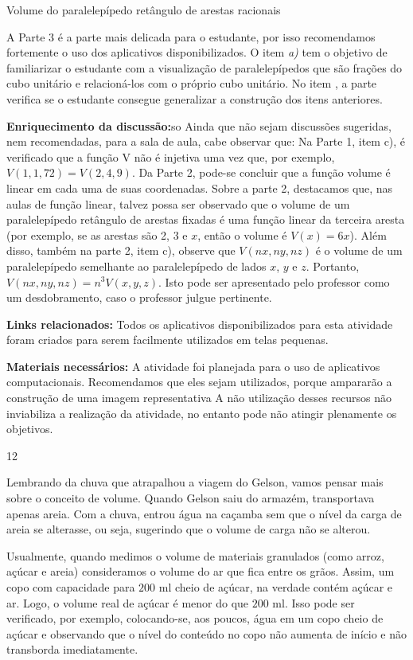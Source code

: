\begin{sugestions}{Volume do paralelepípedo retângulo de arestas racionais}
{
A Parte 3 é a parte mais delicada para o estudante, por isso recomendamos fortemente o uso dos aplicativos disponibilizados.
O item \textit{a)} tem o objetivo de familiarizar o estudante com a visualização de paralelepípedos que são frações do cubo unitário e relacioná-los com o próprio cubo unitário.
No item , a parte  verifica se o estudante consegue generalizar a construção dos itens anteriores.

\textbf{Enriquecimento da discussão:}so
Ainda que não sejam discussões sugeridas, nem recomendadas, para a sala de aula, cabe observar que:
Na Parte 1, item c), é verificado que a função V não é injetiva uma vez que, por exemplo, \(V(1, 1, 72) = V(2, 4, 9)\).
Da Parte 2, pode-se concluir que a função volume é linear em cada uma de suas coordenadas.
Sobre a parte 2, destacamos que, nas aulas de função linear, talvez possa ser observado que o volume de um paralelepípedo retângulo de arestas fixadas é uma função linear da terceira aresta (por exemplo, se as arestas são 2, 3 e \(x\), então o volume é \(V(x) = 6x\)).
Além disso, também na parte 2, item c), observe que \(V(nx, ny, nz)\) é o volume de um paralelepípedo semelhante ao paralelepípedo de lados  \(x\), \(y\) e \(z\). Portanto, \(V(nx, ny, nz) = n^3V(x, y, z)\). Isto pode ser apresentado pelo professor como um desdobramento, caso o professor julgue pertinente.

\textbf{Links relacionados:}
Todos os aplicativos disponibilizados para esta atividade foram criados para serem facilmente utilizados em telas pequenas.

\textbf{Materiais necessários:}
A atividade foi planejada para o uso de aplicativos computacionais. Recomendamos que eles sejam utilizados, porque ampararão a construção de uma imagem representativa  A não utilização desses recursos não inviabiliza a realização da atividade, no entanto pode não atingir plenamente os objetivos.
}{1}{2}
\end{sugestions}

\begin{knowledge}{}

Lembrando da chuva que atrapalhou a viagem do Gelson, vamos pensar mais sobre o conceito de volume. Quando Gelson saiu do armazém, transportava apenas areia. Com a chuva, entrou água na caçamba sem que o nível da carga de areia se alterasse, ou seja, sugerindo que o volume de carga não se alterou.

Usualmente, quando medimos o volume de materiais granulados (como arroz, açúcar e areia) consideramos o volume do ar que fica entre os grãos. Assim, um copo com capacidade para $200$ ml cheio de açúcar, na verdade contém açúcar e ar. Logo, o volume real de açúcar é menor do que $200$ ml. Isso pode ser verificado, por exemplo, colocando-se, aos poucos, água em um copo cheio de açúcar e observando que o nível do conteúdo no copo não aumenta de início e não transborda imediatamente.
\end{knowledge}

